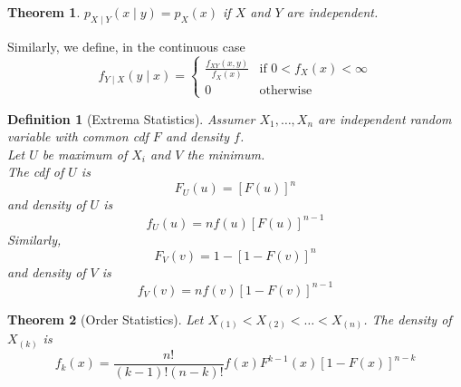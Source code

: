 \documentclass[12pt]{article}
\newtheorem{definition}{Definition}[section]
\newtheorem{theorem}{Theorem}[section]
\theoremstyle{definition}
\begin{document}
\begin{theorem}
\normalfont $p_{X\mid Y}(x\mid y) = p_X(x)$ if $X$ and $Y$ are independent.
\end{theorem}
Similarly, we define, in the continuous case
\[
f_{Y\mid X}(y\mid x) = \begin{cases}
\frac{f_{XY}(x,y)}{f_X(x)} & \text{if } 0<f_X(x)<\infty\\
0 & \text{otherwise}
\end{cases}
\]
\begin{definition}[Extrema Statistics]
\normalfont Assumer $X_1, \ldots, X_n$ are independent random variable with common cdf $F$ and density $f$.\\
Let $U$ be maximum of $X_i$ and $V$ the minimum.\\
The cdf of $U$ is 
\[
F_U(u) = [F(u)]^n
\]
and density of $U$ is
\[
f_U(u) = nf(u)[F(u)]^{n-1}
\]
Similarly,
\[
F_V(v) = 1-[1-F(v)]^n
\]
and density of $V$ is
\[
f_V(v) = nf(v)[1-F(v)]^{n-1}
\]
\end{definition}
\begin{theorem}[Order Statistics]
\normalfont Let $X_{(1)}<X_{(2)}<\ldots<X_{(n)}$. The density of $X_{(k)}$ is
\[
f_k(x) = \frac{n!}{(k-1)!(n-k)!} f(x) F^{k-1}(x)[1-F(x)]^{n-k}
\]
\end{theorem}
\end{document}
